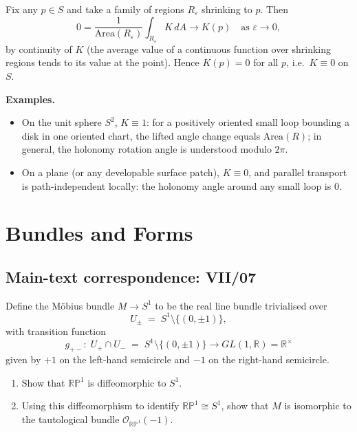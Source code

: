 \begin{solution}
	Fix any $p\in S$ and take a family of regions $R_\varepsilon$ shrinking to $p$.
	Then
	\[
	0=\frac{1}{\mathrm{Area}(R_\varepsilon)}\int_{R_\varepsilon} K\,dA \longrightarrow K(p)
	\quad\text{as }\varepsilon\to 0,
	\]
	by continuity of $K$ (the average value of a continuous function over shrinking regions tends to its value at the point).
	Hence $K(p)=0$ for all $p$, i.e.\ $K\equiv 0$ on $S$.
	
	\par\medskip\noindent\textbf{Examples.}\par\smallskip

	\begin{itemize}
		\item On the unit sphere $S^2$, $K\equiv 1$: for a positively oriented small loop
		bounding a disk in one oriented chart, the lifted angle change equals
		$\mathrm{Area}(R)$; in general, the holonomy rotation angle is understood modulo $2\pi$.
		\item On a plane (or any developable surface patch), $K\equiv 0$, and parallel transport is path-independent locally:
		the holonomy angle around any small loop is $0$.
	\end{itemize}
\end{solution}

\section{Bundles and Forms}

\subsection*{Main-text correspondence: VII/07}

\begin{problem}
\label{prob:cp-vii-0028}

\noindent Define the M\"{o}bius bundle $M\to S^1$ to be the real line bundle trivialised over
\[
U_\pm \;=\; S^1\setminus\{(0,\pm 1)\},
\]
with transition function
\[
g_{+-}:\; U_+\cap U_- \;=\; S^1\setminus\{(0,\pm 1)\}\longrightarrow GL(1,\mathbb{R})=\mathbb{R}^\times
\]
given by $+1$ on the left-hand semicircle and $-1$ on the right-hand semicircle.
\begin{enumerate}
	\item[(a)] Show that $\mathbb{RP}^1$ is diffeomorphic to $S^1$.
	\item[(b)] Using this diffeomorphism to identify $\mathbb{RP}^1\cong S^1$, show that
	$M$ is isomorphic to the tautological bundle $\mathcal{O}_{\mathbb{RP}^1}(-1)$.
\end{enumerate}



\end{problem}

